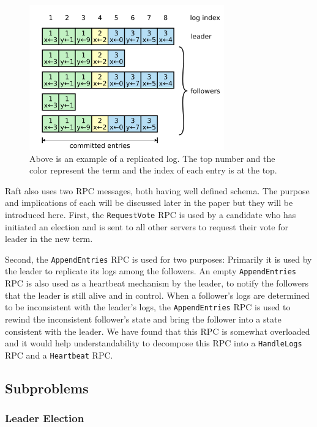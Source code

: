 \begin{figure}
    \centering{}
    \includegraphics[width=0.75\textwidth]{replicatedlog.png}
    \caption{\label{fig:replicatedlog}Above is an example of a replicated log. The top number and the color represent the term and the index of each entry is at the top.}
\end{figure}

Raft also uses two RPC messages, both having well defined schema.
The purpose and implications of each will be discussed later in the paper but they will be introduced here.
First, the \texttt{RequestVote} RPC is used by a candidate who has initiated an election and is sent to all other servers to request their vote for leader in the new term.

Second, the \texttt{AppendEntries} RPC is used for two purposes:
Primarily it is used by the leader to replicate its logs among the followers.
An empty \texttt{AppendEntries} RPC is also used as a heartbeat mechanism by the leader, to notify the followers that the leader is still alive and in control.
When a follower's logs are determined to be inconsistent with the leader's logs, the \texttt{AppendEntries} RPC is used to rewind the inconsistent follower's state and bring the follower into a state consistent with the leader.
We have found that this RPC is somewhat overloaded and it would help understandability to decompose this RPC into a \texttt{HandleLogs} RPC and a \texttt{Heartbeat} RPC.

\subsection{Subproblems}

\subsubsection{Leader Election}

